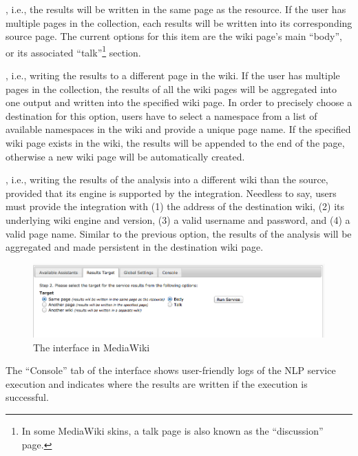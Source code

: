 \begin{description}\itemsep1mm
\item [``Same Page''], i.e., the results will be written in the same page as the resource. If the user has multiple pages in the collection, each results will be written into its corresponding source page. The current options for this item are the wiki page's main ``body'', or its associated ``talk''\footnote{In some MediaWiki skins, a talk page is also known as the ``discussion'' page.} section.
\item [``Another Page''], i.e., writing the results to a different page in the wiki. If the user has multiple pages in the collection, the results of all the wiki pages will be aggregated into one output and written into the specified wiki page. In order to precisely choose a destination for this option, users have to select a namespace from a list of available namespaces in the wiki and provide a unique page name. If the specified wiki page exists in the wiki, the results will be appended to the end of the page, otherwise a new wiki page will be automatically created.
\item [``Another Wiki''], i.e., writing the results of the analysis into a different wiki than the source, provided that its engine is supported by the integration. Needless to say, users must provide the integration with (1) the address of the destination wiki, (2) its underlying wiki engine and version, (3) a valid username and password, and (4) a valid page name. Similar to the previous option, the results of the analysis will be aggregated and made persistent in the destination wiki page.
\end{description}

\begin{figure}
\centering
\includegraphics[width=\textwidth]{pictures/semassist_target.png}
\caption{The \wikinlp interface in MediaWiki}
\label{fig:semassist_target}
\end{figure}

The ``Console'' tab of the \wikinlp interface shows user-friendly logs of the NLP service execution and indicates where the results are written if the execution is successful.

